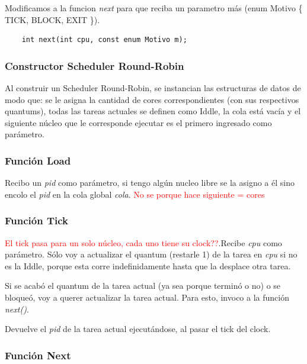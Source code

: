 \documentclass[a4paper]{article}
\begin{document}
\noindent  Modificamos a la funcion \emph{next} para que reciba un parametro m\'as (enum Motivo \{ TICK, BLOCK, EXIT \}).
	\begin{codesnippet}
	\begin{verbatim}
    int next(int cpu, const enum Motivo m);
	\end{verbatim}
	\end{codesnippet}
		
\subsubsection*{Constructor Scheduler Round-Robin}		

Al construir un Scheduler Round-Robin, se instancian las estructuras de datos de modo que: se le asigna la cantidad de cores correspondientes (con sus respectivos quantums), todas las tareas actuales se definen como Iddle, la cola est\'a vac\'ia y el siguiente n\'ucleo que le corresponde ejecutar es el primero ingresado como par\'ametro.

\subsubsection*{Funci\'on Load}

Recibo un \emph{pid} como par\'ametro, si tengo alg\'un nucleo libre se la asigno a \'el sino encolo el \emph{pid} en la cola global \emph{cola}. \textcolor{red}{No se porque hace siguiente = cores}

\subsubsection*{Funci\'on Tick}	

\textcolor{red}{El tick pasa para un solo n\'ucleo, cada uno tiene su clock??}.Recibe \emph{cpu} como par\'ametro. S\'olo voy a actualizar el quantum (restarle 1) de la tarea en \emph{cpu} si no es la Iddle, porque esta corre indefinidamente hasta que la desplace otra tarea.

Si se acab\'o el quantum de la tarea actual (ya sea porque termin\'o o no) o se bloque\'o, voy a querer actualizar la tarea actual. Para esto, invoco a la funci\'on \emph{next()}.

Devuelve el \emph{pid} de la tarea actual ejecut\'andose, al pasar el tick del clock.

\subsubsection*{Funci\'on Next}	
	
\end{document}
